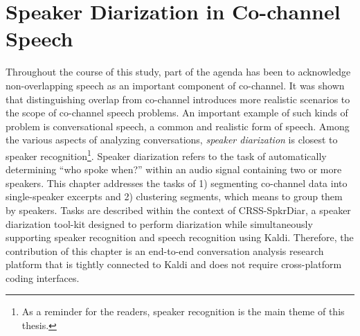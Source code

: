 
\chapter{Speaker Diarization in Co-channel Speech}
\label{chap:spkr_diar}

Throughout the course of this study, part of the agenda has been to acknowledge non-overlapping speech as an important component of co-channel. 
It was shown that distinguishing overlap from co-channel introduces more realistic scenarios to the scope of co-channel speech problems. 
An important example of such kinds of problem is conversational speech, a common and realistic form of speech. 
Among the various aspects of analyzing conversations, {\it speaker diarization} is closest to speaker recognition\footnote{As a reminder for the readers, speaker recognition is the main theme of this thesis.}.
Speaker diarization refers to the task of automatically determining ``who spoke when?'' within an audio signal containing two or more speakers. 
This chapter addresses the tasks of 1) segmenting co-channel data into single-speaker excerpts and 2) clustering segments, which means to group them by speakers. 
Tasks are described within the context of CRSS-SpkrDiar, a speaker diarization tool-kit designed to perform diarization while simultaneously supporting speaker recognition and speech recognition using Kaldi\cite{kaldi}. 
Therefore, the contribution of this chapter is an end-to-end conversation analysis research platform that is tightly connected to Kaldi and does not require cross-platform coding interfaces. 

